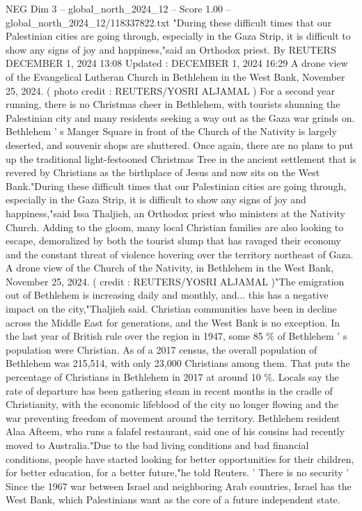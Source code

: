 \begin{textsample}{NEG Dim 3 – global\_north\_2024\_12 – Score 1.00 – global\_north\_2024\_12/118337822.txt}  \label{ex:f3_neg_248}
"During these difficult times that our Palestinian cities are going through, especially in the Gaza Strip, it is difficult to show any signs of joy and happiness,"said an Orthodox priest.
By REUTERS DECEMBER 1, 2024 13:08 Updated : DECEMBER 1, 2024 16:29 A drone view of the Evangelical Lutheran Church in Bethlehem in the West Bank, November 25, 2024. ( photo credit : REUTERS/YOSRI ALJAMAL ) For a second year running, there is no Christmas cheer in Bethlehem, with tourists shunning the Palestinian city and many residents seeking a way out as the Gaza war grinds on.
Bethlehem ' s Manger Square in front of the Church of the Nativity is largely deserted, and souvenir shops are shuttered.
Once again, there are no plans to put up the traditional light-festooned Christmas Tree in the ancient settlement that is revered by Christians as the birthplace of Jesus and now sits on the West Bank."During these difficult times that our Palestinian cities are going through, especially in the Gaza Strip, it is difficult to show any signs of joy and happiness,"said Issa Thaljieh, an Orthodox priest who ministers at the Nativity Church.
Adding to the gloom, many local Christian families are also looking to escape, demoralized by both the tourist slump that has ravaged their economy and the constant threat of violence hovering over the territory northeast of Gaza.
A drone view of the Church of the Nativity, in Bethlehem in the West Bank, November 25, 2024. ( credit : REUTERS/YOSRI ALJAMAL )"The emigration out of Bethlehem is increasing daily and monthly, and... this has a negative impact on the city,"Thaljieh said.
Christian communities have been in decline across the Middle East for generations, and the West Bank is no exception.
In the last year of British rule over the region in 1947, some 85 \% of Bethlehem ' s population were Christian.
As of a 2017 census, the overall population of Bethlehem was 215,514, with only 23,000 Christians among them.
That puts the percentage of Christians in Bethlehem in 2017 at around 10 \%.
Locals say the rate of departure has been gathering steam in recent months in the cradle of Christianity, with the economic lifeblood of the city no longer flowing and the war preventing freedom of movement around the territory.
Bethlehem resident Alaa Afteem, who runs a falafel restaurant, said one of his cousins had recently moved to Australia."Due to the bad living conditions and bad financial conditions, people have started looking for better opportunities for their children, for better education, for a better future,"he told Reuters. ' There is no security ' Since the 1967 war between Israel and neighboring Arab countries, Israel has the West Bank, which Palestinians want as the core of a future independent state.

\end{textsample}
